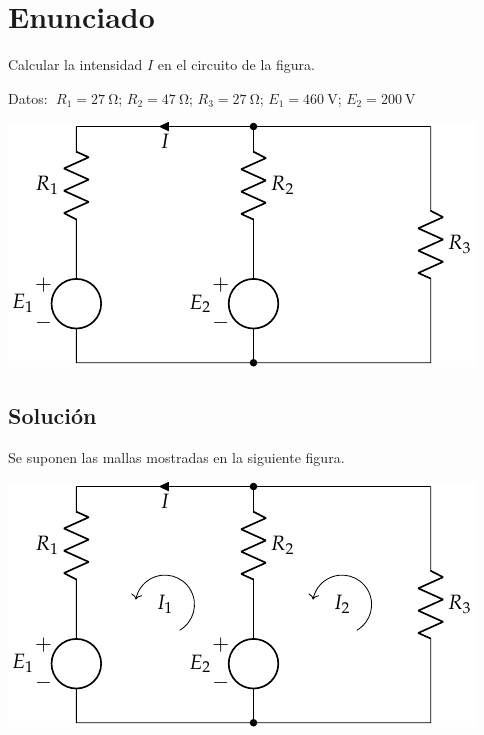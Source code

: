 
\section{Enunciado}
Calcular la intensidad $I$ en el circuito de la figura.

\vspace{2mm}
  Datos: $\; R_1 = \qty{27}{\ohm}$;\; $R_2 = \qty{47}{\ohm}$;\; $R_3 = \qty{27}{\ohm}$;\; $E_1 = \qty{460}{\volt}$;\; $E_2 = \qty{200}{\volt}$
  
\begin{center}
  \includegraphics{figuras/BT1_04.pdf}
\end{center}


\subsection*{Solución}
Se suponen las mallas mostradas en la siguiente figura.

\begin{center}
  \includegraphics{figuras/BT1_04_mallas.pdf}
\end{center}

